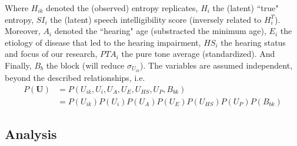 Where $H_{ik}$ denoted the (observed) entropy replicates, $H_{i}$ the (latent) ``true" entropy, $SI_{i}$ the (latent) speech intelligibility score (inversely related to $H^{T}_{i}$). Moreover, $A_{i}$ denoted the ``hearing" age (substracted the minimum age), $E_{i}$ the etiology of disease that led to the hearing impairment, $HS_{i}$ the hearing status and focus of our research, $PTA_{i}$ the pure tone average (standardized). And Finally, $B_{b}$ the block (will reduce $\sigma_{U_{ik}}$). The variables are assumed independent, beyond the described relationships, i.e. 
\begin{equation*}
	\begin{aligned} 
		P(\pmb{U}) & = P(U_{ik}, U_{i}, U_{A}, U_{E}, U_{HS}, U_{P}, B_{bk}) \\ 
		& = P(U_{ik}) P(U_{i}) P(U_{A}) P(U_{E}) P(U_{HS}) P(U_{P}) P(B_{bk})
	\end{aligned}
\end{equation*}
%
%
%
%
\subsection{Analysis} 
%

%
%
